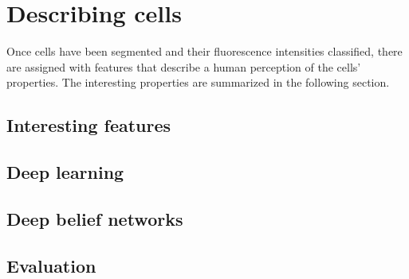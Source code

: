 
\chapter{Describing cells} %

\label{Chapter6} %


Once cells have been segmented and their fluorescence intensities classified, there are assigned with features that describe a human perception of the cells' properties. The interesting properties are summarized in the following section. 



\section{Interesting features}





\section{Deep learning}






\section{Deep belief networks}






\section{Evaluation}

